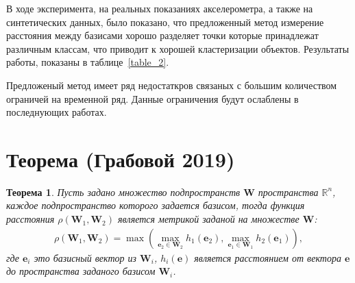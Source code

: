 \documentclass[12pt, twoside]{article}
\newtheorem{theorem}{Теорема}
\numberwithin{equation}{section}
\begin{document}
В ходе эксперимента, на реальных показаниях акселерометра, а также на синтетических данных, было показано, что предложенный метод измерение расстояния между базисами хорошо разделяет точки которые принадлежат различным классам, что приводит к хорошей кластеризации объектов. Результаты работы, показаны в таблице~\ref{table_2}.

Предложеный метод имеет ряд недостаткров связаных с большим количеством ограничей на временной ряд. Данные ограничения будут ослаблены в последнующих работах.



\appendix
\setcounter{theorem}{0}
\section{Теорема (Грабовой 2019)}\label{ProofTheorem1}
\begin{theorem}\label{th:1} 
Пусть задано множество подпространств $\mathbf{W}$ пространства $\mathbb{R}^{n}$, каждое подпространство которого задается базисом, тогда функция расстояния $\rho\left(\textbf{W}_1, \textbf{W}_2\right)$ является метрикой заданой на множестве $\mathbf{W}$:
\begin{equation}
\label{eq:th2:1}
\begin{aligned}
\rho\left(\textbf{W}_1, \textbf{W}_2\right) = \max\left(\max_{\textbf{e}_2 \in \textbf{W}_2} h_{1}\left(\textbf{e}_2\right), \max_{\textbf{e}_1 \in \textbf{W}_1} h_{2}\left(\textbf{e}_1\right)\right),
\end{aligned}
\end{equation}
где $\textbf{e}_i$ это базисный вектор из $\textbf{W}_i$, $h_i\left(\textbf{e}\right)$ является расстоянием от вектора $\textbf{e}$ до пространства заданого базисом $\textbf{W}_i$.
\end{theorem}
\end{document}
